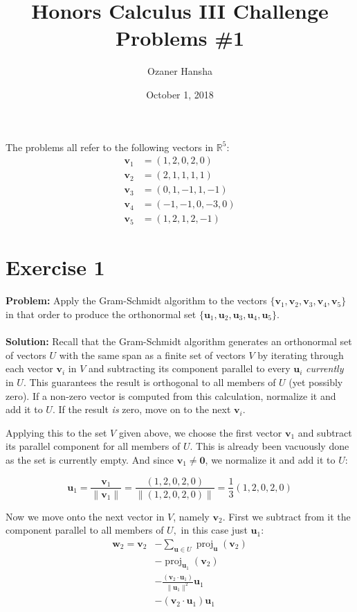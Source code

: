 \documentclass{article}
\begin{document}
\title{Honors Calculus III Challenge Problems \#1}
\author{Ozaner Hansha}
\date{October 1, 2018}
\maketitle

\noindent The problems all refer to the following vectors in $\mathbb R^5$:
\begin{align*}
  \mathbf v_1&=(1, 2, 0, 2, 0)\\
  \mathbf v_2&=(2, 1, 1, 1, 1)\\
  \mathbf v_3&=(0, 1, -1, 1, -1)\\
  \mathbf v_4&=(-1, -1, 0, -3, 0)\\
  \mathbf v_5&=(1, 2, 1, 2, -1)
\end{align*}

\section*{Exercise 1}
\textbf{Problem:} Apply the Gram-Schmidt algorithm to the vectors $\{\mathbf v_1, \mathbf v_2, \mathbf v_3, \mathbf v_4, \mathbf v_5\}$ in that order to produce the orthonormal set $\{\mathbf u_1, \mathbf u_2, \mathbf u_3, \mathbf u_4, \mathbf u_5\}$.
\\\\
\textbf{Solution:} Recall that the Gram-Schmidt algorithm generates an orthonormal set of vectors $U$ with the same span as a finite set of vectors $V$ by iterating through each vector $\mathbf v_i$ in $V$ and subtracting its component parallel to every $\mathbf u_i$ \textit{currently} in $U$. This guarantees the result is orthogonal to all members of $U$ (yet possibly zero). If a non-zero vector is computed from this calculation, normalize it and add it to $U$. If the result \textit{is} zero, move on to the next $\mathbf v_i$.

Applying this to the set $V$ given above, we choose the first vector $\mathbf v_1$ and subtract its parallel component for all members of $U$. This is already been vacuously done as the set is currently empty. And since $\mathbf v_1\not=\mathbf 0$, we normalize it and add it to $U$:

$$\mathbf u_1=\frac{\mathbf v_1}{\|\mathbf v_1\|}=\frac{(1, 2, 0, 2, 0)}{\|(1, 2, 0, 2, 0)\|}=\boxed{\frac{1}{3}(1, 2, 0, 2, 0)}$$

Now we move onto the next vector in $V$, namely $\mathbf v_2$. First we subtract from it the component parallel to all members of $U,$ in this case just $\mathbf u_1$:
\begin{align*}
  \mathbf w_2=\mathbf v_2&-\sum_{\mathbf u\in U}\operatorname{proj}_\mathbf u(\mathbf v_2)\\
  &-\operatorname{proj}_{\mathbf u_1}(\mathbf v_2)\tag{only $\mathbf u_1$ in $U$}\\
  &-\frac{(\mathbf v_2\cdot\mathbf u_1)}{\|\mathbf u_1\|^2}\mathbf u_1\tag{def. of projection}\\
  &-(\mathbf v_2\cdot\mathbf u_1)\mathbf u_1\tag{$\mathbf u$ is normal}
\end{align*}
\end{document}
